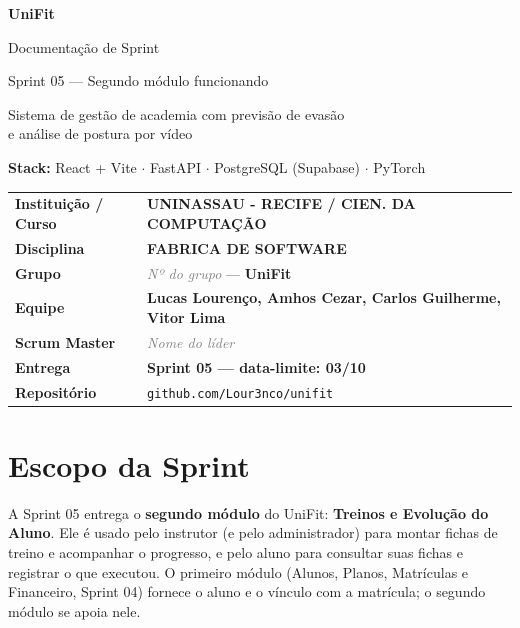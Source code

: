\documentclass[11pt,a4paper,final]{article}
\newcommand{\cod}[1]{\texttt{#1}}
\newcommand{\preencher}[1]{\textit{\textcolor{gray}{#1}}}
\begin{document}
\begin{titlepage}
  \centering
  \vspace*{3cm}
  {\Huge\bfseries\color{azul} UniFit\par}
  \vspace{0.6cm}
  {\LARGE Documentação de Sprint\par}
  \vspace{0.3cm}
  {\Large Sprint 05 --- Segundo módulo funcionando\par}
  \vspace{1.2cm}
  {\large Sistema de gestão de academia com previsão de evasão\\
  e análise de postura por vídeo\par}
  \vspace{0.8cm}
  {\small\textbf{Stack:} React + Vite $\cdot$ FastAPI $\cdot$ PostgreSQL (Supabase) $\cdot$ PyTorch\par}
  \vfill
  \begin{tabular}{>{\bfseries}l l}
    \toprule
    Instituição / Curso & \textbf{UNINASSAU - RECIFE / CIEN. DA COMPUTAÇÃO} \\
    Disciplina          & \textbf{FABRICA DE SOFTWARE} \\
    Grupo               & \preencher{Nº do grupo} --- \textbf{UniFit} \\
    Equipe              & \textbf{Lucas Lourenço, Amhos Cezar, Carlos Guilherme, Vitor Lima} \\
    Scrum Master        & \preencher{Nome do líder} \\
    Entrega             & \textbf{Sprint 05 --- data-limite: 03/10} \\
    Repositório         & \cod{github.com/Lour3nco/unifit} \\
    \bottomrule
  \end{tabular}
  \vspace{1.5cm}
\end{titlepage}

\tableofcontents
\newpage


\section{Escopo da Sprint}

A Sprint 05 entrega o \textbf{segundo módulo} do UniFit: \textbf{Treinos e Evolução do Aluno}. Ele é usado pelo
instrutor (e pelo administrador) para montar fichas de treino e acompanhar o progresso, e pelo aluno para
consultar suas fichas e registrar o que executou. O primeiro módulo (Alunos, Planos, Matrículas e Financeiro,
Sprint 04) fornece o aluno e o vínculo com a matrícula; o segundo módulo se apoia nele.
\end{document}
